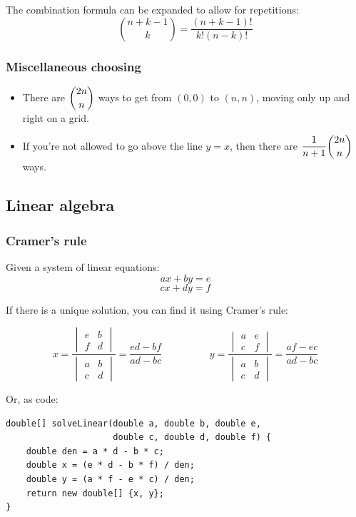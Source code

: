 \documentclass[a4paper,12pt]{article}
\begin{document}
The combination formula can be expanded to allow for repetitions:
\[{{n + k - 1}\choose k}=\frac{(n+k-1)!}{k!(n-k)!}\]

\subsubsection{Miscellaneous choosing}
\begin{itemize}
\item There are $\dbinom{2n}{n}$ ways to get from $(0,0)$ to $(n,n)$, moving only up and right on a grid.
\item If you're not allowed to go above the line $y=x$, then there are $\dfrac{1}{n+1}\dbinom{2n}{n}$ ways.
\end{itemize}

\subsection{Linear algebra}
\subsubsection{Cramer's rule}
Given a system of linear equations:
\[ax + by = e\]
\[cx + dy = f\]

\noindent If there is a unique solution, you can find it using Cramer's rule:

\[
x = \frac{\begin{vmatrix}e & b \\ f & d\end{vmatrix}}{\begin{vmatrix}a & b \\ c & d\end{vmatrix}} = \frac{ed-bf}{ad-bc}
\hspace{2cm}
y = \frac{\begin{vmatrix}a & e \\ c & f\end{vmatrix}}{\begin{vmatrix}a & b \\ c & d\end{vmatrix}} = \frac{af-ec}{ad-bc}
\]

\noindent Or, as code:

\begin{lstlisting}
double[] solveLinear(double a, double b, double e,
					 double c, double d, double f) {
	double den = a * d - b * c;
	double x = (e * d - b * f) / den;
	double y = (a * f - e * c) / den;
	return new double[] {x, y};
}
\end{lstlisting}
\end{document}

